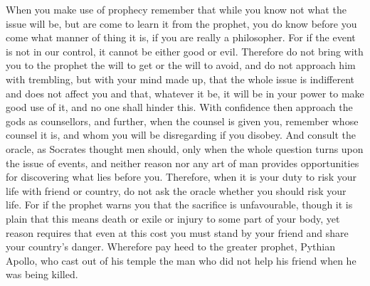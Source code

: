 When you make use  of prophecy remember that while you know  not what the issue
will be, but are come to learn it from the prophet, you do know before you come
what manner of thing  it is, if you are really a philosopher.  For if the event
is not in our control, it cannot be either good or evil. Therefore do not bring
with you  to the  prophet the  will to  get or the  will to  avoid, and  do not
approach him with trembling,  but with your mind made up,  that the whole issue
is indifferent and does not affect you and  that, whatever it be, it will be in
your  power to  make  good  use of  it,  and no  one  shall  hinder this.  With
confidence then approach the gods as counsellors, and further, when the counsel
is given you, remember  whose counsel it is, and whom  you will be disregarding
if you  disobey. And consult the  oracle, as Socrates thought  men should, only
when the whole question turns upon the  issue of events, and neither reason nor
any art  of man provides  opportunities for  discovering what lies  before you.
Therefore, when it  is your duty to  risk your life with friend  or country, do
not ask the oracle whether you should  risk your life. For if the prophet warns
you that  the sacrifice  is unfavourable,  though it is  plain that  this means
death or exile  or injury to some  part of your body, yet  reason requires that
even  at this  cost you  must stand  by your  friend and  share your  country's
danger. Wherefore pay heed to the greater prophet, Pythian Apollo, who cast out
of his temple the man who did not help his friend when he was being killed.
